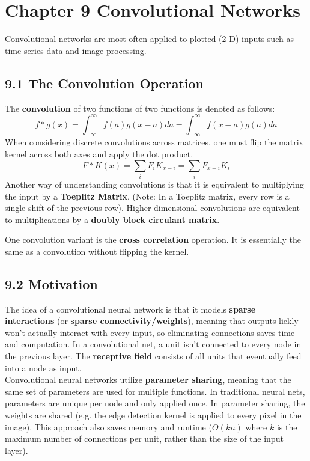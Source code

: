 \documentclass[a4paper]{report}
\begin{document}
\section{Chapter 9 Convolutional Networks}
Convolutional networks are most often applied to plotted (2-D) inputs such as time series data and image processing.

\subsection{9.1 The Convolution Operation}
The \textbf{convolution} of two functions of two functions is denoted as follows:
$$f*g(x)=\int_{-\infty}^{\infty}f(a)g(x-a)da=\int_{-\infty}^{\infty}f(x-a)g(a)da$$
When considering discrete convolutions across matrices, one must flip the matrix kernel across both axes and apply the dot product.
$$F*K(x)=\sum_i F_{i}K_{x-i}=\sum_i F_{x-i}K_{i}$$
Another way of understanding convolutions is that it is equivalent to multiplying the input by a \textbf{Toeplitz Matrix}. (Note: In a Toeplitz matrix, every row is a single shift of the previous row). Higher dimensional convolutions are equivalent to multiplications by a \textbf{doubly block circulant matrix}.

One convolution variant is the \textbf{cross correlation} operation. It is essentially the same as a convolution without flipping the kernel.

\subsection{9.2 Motivation}
The idea of a convolutional neural network is that it models \textbf{sparse interactions} (or \textbf{sparse connectivity/weights}), meaning that outputs liekly won't actually interact with every input, so eliminating connections saves time and computation. In a convolutional net, a unit isn't connected to every node in the previous layer. The \textbf{receptive field} consists of all units that eventually feed into a node as input.\\
Convolutional neural networks utilize \textbf{parameter sharing}, meaning that the same set of parameters are used for multiple functions. In traditional neural nets, parameters are unique per node and only applied once. In parameter sharing, the weights are shared (e.g. the edge detection kernel is applied to every pixel in the image). This approach also saves memory and runtime ($O(kn)$ where $k$ is the maximum number of connections per unit, rather than the size of the input layer).
\end{document}
